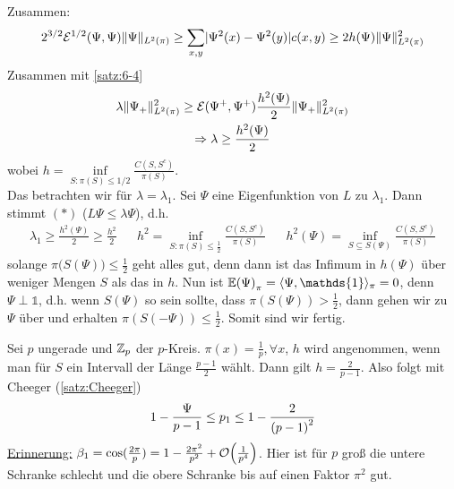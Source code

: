 \begin{beweis}
	Zusammen: 
	\begin{align}
		2^{3/2} \mathcal{E}^{1/2}(\Psi,\Psi) \lVert\Psi\rVert_{L^2(\pi)} \geq \sum\limits_{x,y} \lvert\Psi^2(x) - \Psi^2(y)\rvert c(x,y) \geq 2 h(\Psi) \lVert\Psi\rVert^2_{L^2(\pi)}
	\end{align}
	Zusammen mit \autoref{satz:6-4}
	\begin{gather}
		\lambda \lVert\Psi_+\rVert^2_{L^2(\pi)} \geq \mathcal{E}(\Psi^+,\Psi^+) \frac{h^2(\Psi)}{2} \lVert\Psi_+\rVert^2_{L^2(\pi)} \\
		\Rightarrow \lambda \geq \frac{h^2(\Psi)}{2}
	\end{gather}	
	wobei $h = \inf\limits_{S: \pi(S) \leq 1/2} \frac{C(S,S^c)}{\pi(S)}$. \\
	Das betrachten wir für $\lambda = \lambda_1$. Sei $\Psi$ eine Eigenfunktion von $L$ zu $\lambda_1$. Dann stimmt $(*)$ ($L\Psi \leq \lambda\Psi $), d.h. 
	\begin{align}
		\lambda_1 \geq \frac{h^2(\Psi)}{2} \geq \frac{h^2}{2} &&  h^2 = \inf\limits_{S: \pi(S) \leq \frac{1}{2}} \frac{C(S,S^c)}{\pi(S)} && h^2(\Psi) = \inf\limits_{S \subseteq S(\Psi)} \frac{C(S,S^c)}{\pi(S)}
	\end{align}
	solange $\pi\Big(S(\Psi)\Big) \leq \frac{1}{2}$ geht alles gut, denn dann ist das Infimum in $h(\Psi)$ über weniger Mengen $S$ als das in $h$. Nun ist $\EW{\Psi}_{\pi} = \sprod{\Psi, \mathds{1}}_{\pi} = 0$, denn $\Psi \perp \mathds{1}$, d.h. wenn $S(\Psi)$ so sein sollte, dass $\pi(S(\Psi)) > \frac{1}{2}$, dann gehen wir zu $\Psi$ über und erhalten $\pi(S(-\Psi)) \leq \frac{1}{2}$. Somit sind wir fertig.
\end{beweis}
\begin{beispiel}%
	Sei $p$ ungerade und $\mathbb{Z}_p$ der $p$-Kreis. $\pi(x) = \frac{1}{p}, \forall x$, $h$ wird angenommen, wenn man für $S$ ein Intervall der Länge $\frac{p-1}{2}$ wählt. Dann gilt $h = \frac{2}{p-1}$. Also folgt mit Cheeger (\autoref{satz:Cheeger})
	\begin{align}
	1 - \frac{\Psi}{p-1} \leq p_1 \leq 1 - \frac{2}{\left(p-1\right)^2}
	\end{align}
	\underline{Erinnerung:} $\beta_1 = \cos(\frac{2\pi}{p}) = 1 - \frac{2\pi^2}{p^2} + \mathcal{O}\enb{\frac{1}{p^4}}$. Hier ist für $p$ groß die untere Schranke schlecht und die obere Schranke bis auf einen Faktor $\pi^2$ gut.
\end{beispiel}

